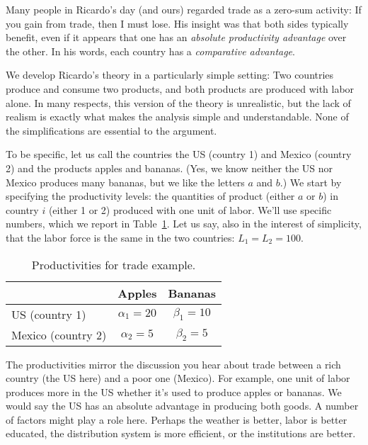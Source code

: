 Many people in Ricardo's day (and ours) regarded trade as a
zero-sum activity:  If {you} gain from trade, then I must lose.  His
insight was that both sides typically benefit, even if it appears
that one has an \textit{absolute productivity advantage} over the
other. In his words, each country has a \textit{comparative
advantage}.

We develop Ricardo's theory in a particularly simple setting:
Two countries produce and consume two products, and both products
are produced with labor alone.  In many respects, this version of
the theory is unrealistic, but the lack of realism is exactly what
makes the analysis simple and understandable.
None of the simplifications are essential to the argument.

To be specific, let us call the countries the US (country 1) and
Mexico (country 2) and the products apples and bananas.  (Yes, we
know neither the US nor Mexico produces many bananas, but we like
the letters $a$ and $b$.)  We start by specifying the productivity
levels: the quantities of product (either $a$ or $b$) in country
$i$ (either 1 or 2) produced with one unit of labor.
We'll use specific numbers, which we report in Table~\ref{tab:prod}.
Let us say, also in the interest of simplicity,
that the labor force is the same in the two countries: $L_{1}=L_{2}=100$.

\begin{table}[h]
\centering
\caption{Productivities for trade example.}
\begin{tabular}{lcc}
\toprule
                    &        Apples       &      Bananas    \\%

\midrule
US (country 1)      &   $\alpha_{1}=20$   & $\beta_{1}=10$  \\%
Mexico (country 2)  &   $\alpha_{2}=5$    & $\beta_{2}=5$   \\%
\bottomrule
\end{tabular}
\label{tab:prod}
\end{table}


The productivities mirror the discussion you hear about trade
between a rich country (the US here) and a poor one (Mexico).
For example, one unit of labor produces more in the US
whether it's used to produce apples or bananas.
We would say the US has an {absolute advantage} in producing both goods.
A number of factors might play a role here. Perhaps the weather is
better, labor is better educated, the distribution system is
more efficient, or the institutions are better.


